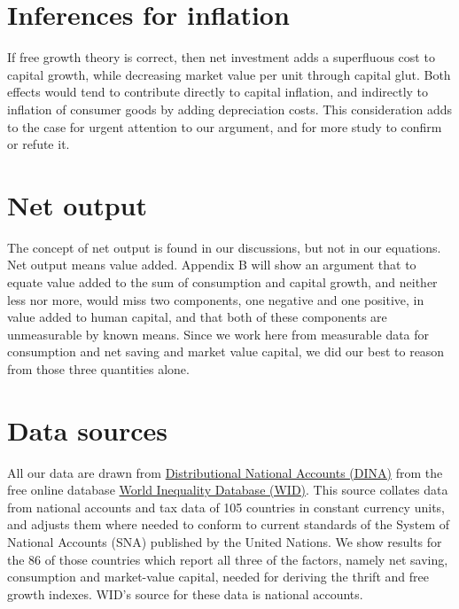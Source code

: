 \documentclass[a4paper,fleqn]{latex_styles/cas-sc}
\begin{document}
\section{Inferences for inflation}

If free growth theory is correct, then net investment adds a superfluous cost to capital growth, while decreasing market value per unit through capital glut. Both effects would tend to contribute directly to capital inflation, and indirectly to inflation of consumer goods by adding depreciation costs. This consideration adds to the case for urgent attention to our argument, and for more study to confirm or refute it.

\hypertarget{net-output}{
\section{Net output}\label{net-output}
}
The concept of net output is found in our discussions, but not in our equations. Net output means value added. Appendix B will show an argument that to equate value added to the sum of consumption and capital growth, and neither less nor more, would miss two components, one negative and one positive, in value added to human capital, and that both of these components are unmeasurable by known means. Since we work here from measurable data for consumption and net saving and market value capital, we did our best to reason from those three quantities alone.
%



\hypertarget{data-sources}{%
\section{Data sources}\label{data-sources}}

All our data are drawn from \href{https://wid.world/document/distributional-national-accounts-guidelines-2020-concepts-and-methods-used-in-the-world-inequality-database/}{Distributional National Accounts (DINA)} from the free online database \href{wid.world.com}{World
Inequality Database (WID)}. This source collates data from national accounts and tax data
of 105 countries in constant currency units, and adjusts them where needed to conform to current standards of the System of National Accounts
(SNA) published by the United Nations. We show results for the 86 of
those countries which report all three of the factors, namely net
saving, consumption and market-value capital, needed for deriving
the thrift and free growth indexes. WID's source for these data is national accounts.
\end{document}
